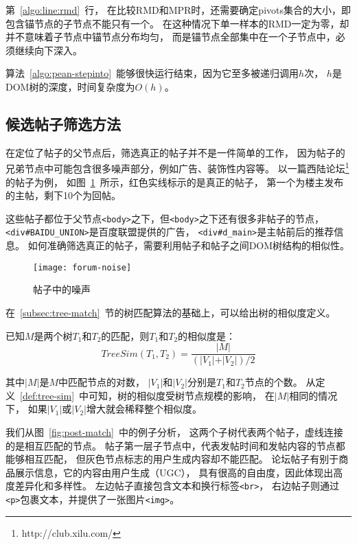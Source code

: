 第~\ref{algo:line:rmd}~行，
在比较RMD和MPR时，还需要确定pivots集合的大小，即包含锚节点的子节点不能只有一个。
在这种情况下单一样本的RMD一定为零，却并不意味着子节点中锚节点分布均匀，
而是锚节点全部集中在一个子节点中，必须继续向下深入。

算法~\ref{algo:pean-stepinto}~能够很快运行结束，因为它至多被递归调用$h$次，
$h$是DOM树的深度，时间复杂度为$O(h)$。

\subsection{候选帖子筛选方法}
在定位了帖子的父节点后，筛选真正的帖子并不是一件简单的工作，
因为帖子的兄弟节点中可能包含很多噪声部分，例如广告、装饰性内容等。
以一篇西陆论坛\footnote{http://club.xilu.com/}的帖子为例，
如图~\ref{fig:forum-noise}~所示，红色实线标示的是真正的帖子，
第一个为楼主发布的主帖，剩下10个为回帖。

这些帖子都位于父节点\texttt{<body>}之下，但\texttt{<body>}之下还有很多非帖子的节点，
\texttt{<div\#BAIDU\_UNION>}是百度联盟提供的广告，
\texttt{<div\#d\_main>}是主帖前后的推荐信息。
如何准确筛选真正的帖子，需要利用帖子和帖子之间DOM树结构的相似性。

\begin{figure}[t]
\centering
\texttt{[image: forum-noise]}
\caption{帖子中的噪声}
\label{fig:forum-noise}
\end{figure}

在~\ref{subsec:tree-match}~节的树匹配算法的基础上，可以给出树的相似度定义。

\begin{definition}
\label{def:tree-sim}
已知$M$是两个树$T_1$和$T_2$的匹配，则$T_1$和$T_2$的相似度是：
\begin{equation}
TreeSim(T_1, T_2) = \frac{\vert M \vert}
{(\vert V_1 \vert + \vert V_2 \vert) / 2}
\end{equation}
\end{definition}

其中$\vert M \vert$是$M$中匹配节点的对数，
$\vert V_1 \vert$和$\vert V_2 \vert$分别是$T_1$和$T_2$节点的个数。
从定义~\ref{def:tree-sim}~中可知，树的相似度受树节点规模的影响，
在$\vert M \vert$相同的情况下，
如果$\vert V_1 \vert$或$\vert V_2 \vert$增大就会稀释整个相似度。

我们从图~\ref{fig:post-match}~中的例子分析，
这两个子树代表两个帖子，虚线连接的是相互匹配的节点。
帖子第一层子节点中，代表发帖时间和发帖内容的节点都能够相互匹配，
但灰色节点标志的用户生成内容却不能匹配。
论坛帖子有别于商品展示信息，它的内容由用户生成（UGC），
具有很高的自由度，因此体现出高度差异化和多样性。
左边帖子直接包含文本和换行标签\texttt{<br>}，
右边帖子则通过\texttt{<p>}包裹文本，并提供了一张图片\texttt{<img>}。

